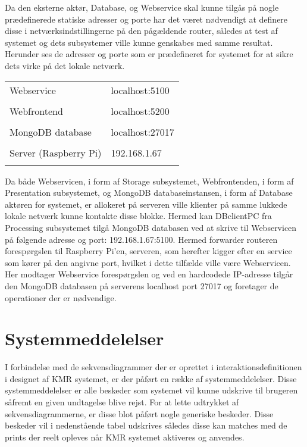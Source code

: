 \begin{appendices}
Da den eksterne aktør, Database, og Webservice skal kunne tilgås på nogle prædefinerede statiske adresser og porte har det været nødvendigt at definere disse i netværksindstillingerne på den pågældende router, således at test af systemet og dets subsystemer ville kunne genskabes med samme resultat.
Herunder ses de adresser og porte som er prædefineret for systemet for at sikre dets virke på det lokale netværk.

\begin{tabular}{ p{4cm} | p{8cm} }
	Webservice & localhost:5100 \\ \\
	Webfrontend & localhost:5200 \\ \\
	MongoDB database & localhost:27017 \\ \\
	Server (Raspberry Pi) & 192.168.1.67 \\ \\
\end{tabular}

Da både Webservicen, i form af Storage subsystemet, Webfrontenden, i form af Presentation subsystemet, og MongoDB databaseinstansen, i form af Database aktøren for systemet, er allokeret på serveren ville klienter på samme lukkede lokale netværk kunne kontakte disse blokke. Hermed kan DBclientPC fra Processing subsystemet tilgå MongoDB databasen ved at skrive til Webservicen på følgende adresse og port: 192.168.1.67:5100. Hermed forwarder routeren forespørgslen til Raspberry Pi'en, serveren, som herefter kigger efter en service som kører på den angivne port, hvilket i dette tilfælde ville være Webservicen. Her modtager Webservice forespørgslen og ved en hardcodede IP-adresse tilgår den MongoDB databasen på serverens localhost port 27017 og foretager de operationer der er nødvendige.

\pagebreak


\chapter{Systemmeddelelser} \label{appendix::systemmeddelelser}
I forbindelse med de sekvensdiagrammer der er oprettet i interaktionsdefinitionen i designet af KMR systemet, er der påført en række af systemmeddelelser. Disse systemmeddelelser er alle beskeder som systemet vil kunne udskrive til brugeren såfremt en given undtagelse blive rejst. For at lette udtrykket af sekvensdiagrammerne, er disse blot påført nogle generiske beskeder. Disse beskeder vil i nedenstående tabel udskrives således disse kan matches med de prints der reelt opleves når KMR systemet aktiveres og anvendes. 


\end{appendices}
